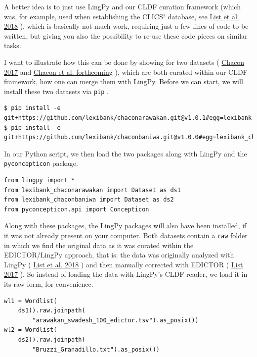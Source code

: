 \documentclass[
  english,
  a4paper,
  oneside,tablecaptionabove
]{scrbook}
\newcommand{\passthrough}[1]{#1}
\begin{document}
A better idea is to just use LingPy and our CLDF curation framework
\protect\hypertarget{more-1668}{}{} (which was, for example, used when
establishing the CLICS² database, see
\href{http://bibliography.lingpy.org?key=List2018f}{List et al. 2018} ),
which is basically not much work, requiring just a few lines of code to
be written, but giving you also the possibility to re-use these code
pieces on similar tasks.

I want to illustrate how this can be done by showing for two datasets (
\href{http://bibliography.lingpy.org?key=Chacon2017}{Chacon 2017} and
\href{///home/mattis/projects/blogposts/calc-7-merging/Chacon2018}{Chacon
et al. forthcoming} ), which are both curated within our CLDF framework,
how one can merge them with LingPy. Before we can start, we will install
these two datasets via \passthrough{\lstinline!pip!} .

\begin{lstlisting}
$ pip install -e git+https://github.com/lexibank/chaconarawakan.git@v1.0.1#egg=lexibank_chaconarawakan
$ pip install -e git+https://github.com/lexibank/chaconbaniwa.git@v1.0.0#egg=lexibank_chaconbaniwa
\end{lstlisting}

In our Python script, we then load the two packages along with LingPy
and the \passthrough{\lstinline!pyconcepticon!} package.

\begin{lstlisting}
from lingpy import *
from lexibank_chaconarawakan import Dataset as ds1
from lexibank_chaconbaniwa import Dataset as ds2
from pyconcepticon.api import Concepticon
\end{lstlisting}

\leavevmode\hypertarget{markdown}{}%
Along with these packages, the LingPy packages will also have been
installed, if it was not already present on your computer. Both datasets
contain a \passthrough{\lstinline!raw!} folder in which we find the
original data as it was curated within the EDICTOR/LingPy approach, that
is: the data was originally analyzed with LingPy (
\href{http://bibliography.lingpy.org?key=List2018i}{List et al. 2018} )
and then manually corrected with EDICTOR (
\href{http://bibliography.lingpy.org?key=List2017d}{List 2017} ). So
instead of loading the data with LingPy's CLDF reader, we load it in its
raw form, for convenience.

\begin{lstlisting}
wl1 = Wordlist(
    ds1().raw.joinpath(
        "arawakan_swadesh_100_edictor.tsv").as_posix()) 
wl2 = Wordlist(
    ds2().raw.joinpath(
        "Bruzzi_Granadillo.txt").as_posix())
\end{lstlisting}
\end{document}
